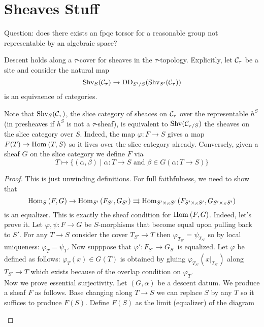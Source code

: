 \documentclass[12pt]{article}
\begin{document}
\section{Sheaves Stuff}

Question: does there exists an fpqc torsor for a reasonable group not representable by an algebraic space?

\newcommand{\Shv}{\mathrm{Shv}}

\begin{lemma}
Descent holds along a $\tau$-cover for sheaves in the $\tau$-topology. Explicitly, let $\mathcal{C}_\tau$ be a site and consider the natural map
\[ \Shv_S(\C_\tau) \to \mathrm{DD}_{S'/S}(\Shv_{S'}(\C_\tau)) \]
is an equivaence of categories. 
\end{lemma}

\begin{rmk}
Note that $\Shv_S(\C_\tau)$, the slice category of sheaces on $\mathcal{C}_\tau$ over the representable $h^S$ (in presheaves if $h^S$ is not a $\tau$-sheaf), is equivalent to $\Shv(\C_{\tau / S})$ the sheaves on the slice category over $S$. Indeed, the map $\varphi : F \to S$ gives a map $F(T) \to \mathrm{Hom}_{} \left( T, S \right)$ so it lives over the slice category already. Conversely, given a sheaf $G$ on the slice category we define $F$ via 
\[ T \mapsto \{ (\alpha, \beta) \mid \alpha : T \to S \text{ and } \beta \in G(\alpha : T \to S) \} \]
\end{rmk}

\begin{proof}
This is just unwinding definitions. For full faithfulness, we need to show that
\[ \mathrm{Hom}_{S} \left( F, G \right) \to \mathrm{Hom}_{S'} \left( F_{S'}, G_{S'} \right) \rightrightarrows \mathrm{Hom}_{S' \times_S S'} \left( F_{S' \times_S S'}, G_{S' \times_S S'} \right) \]
is an equalizer. This is exactly the sheaf condition for $\mathrm{Hom}_{} \left( F, G \right)$. Indeed, let's prove it. Let $\varphi, \psi : F \to G$ be $S$-morphisms that become equal upon pulling back to $S'$. For any $T \to S$ consider the cover $T_{S'} \to T$ then $\varphi_{T_{S'}} = \psi_{T_{S'}}$ so by local uniqueness: $\varphi_T = \psi_T$. Now supppose that $\varphi' : F_{S'} \to G_{S'}$ is equalized. Let $\varphi$ be defined as follows: $\varphi_T(x) \in G(T)$ is obtained by gluing $\varphi_{T_{S'}}(x|_{T_{S'}})$ along $T_{S'} \to T$ which exists because of the overlap condition on $\varphi_T$.
\bigskip\\
Now we prove essential surjectivity. Let $(G, \alpha)$ be a descent datum. We produce a sheaf $F$ as follows. Base changing along $T \to S$ we can replace $S$ by any $T$ so it suffices to produce $F(S)$. Define $F(S)$ as the limit (equalizer) of the diagram
\begin{center}
\end{center}
\end{proof}
\end{document}
